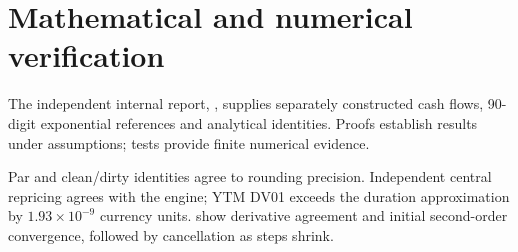 \chapter{Mathematical and numerical verification}\label{ch:verification}
The independent internal report, , supplies separately constructed cash flows, 90-digit exponential references and analytical identities. Proofs establish results under assumptions; tests provide finite numerical evidence.

Par and clean/dirty identities agree to rounding precision. Independent central repricing agrees with the engine; YTM DV01 exceeds the duration approximation by \(1.93\times10^{-9}\) currency units.  show derivative agreement and initial second-order convergence, followed by cancellation as steps shrink.

